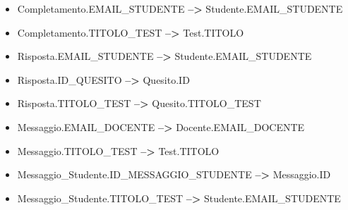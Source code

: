 \documentclass{article}
\begin{document}
\begin{itemize}[label={ }, leftmargin=*, wide=1pt]
    \item Completamento.EMAIL\_STUDENTE \textbf{-->} Studente.EMAIL\_STUDENTE
    \item Completamento.TITOLO\_TEST \textbf{-->} Test.TITOLO
    \item Risposta.EMAIL\_STUDENTE \textbf{-->} Studente.EMAIL\_STUDENTE
    \item Risposta.ID\_QUESITO \textbf{-->} Quesito.ID
    \item Risposta.TITOLO\_TEST \textbf{-->} Quesito.TITOLO\_TEST
    \item Messaggio.EMAIL\_DOCENTE \textbf{-->} Docente.EMAIL\_DOCENTE
    \item Messaggio.TITOLO\_TEST \textbf{-->} Test.TITOLO
    \item Messaggio\_Studente.ID\_MESSAGGIO\_STUDENTE \textbf{-->} Messaggio.ID
    \item Messaggio\_Studente.TITOLO\_TEST \textbf{-->} Studente.EMAIL\_STUDENTE
\end{itemize}
       
\end{document}
